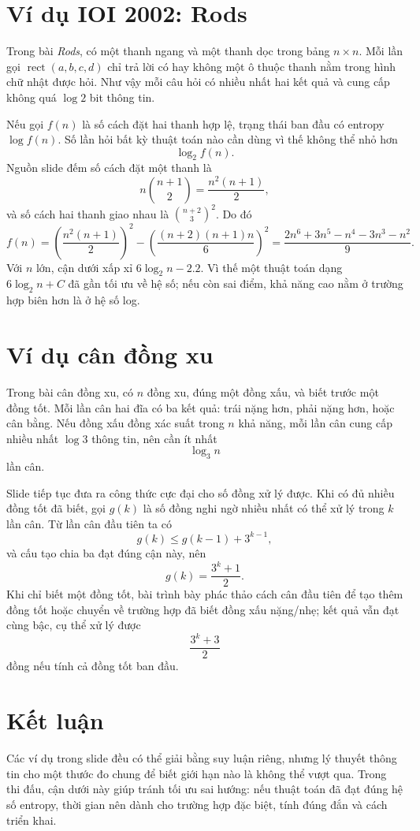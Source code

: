 \documentclass[11pt]{article}
\begin{document}
\section{Ví dụ IOI 2002: Rods}

Trong bài \textit{Rods}, có một thanh ngang và một thanh dọc trong bảng
\(n\times n\). Mỗi lần gọi
\(\operatorname{rect}(a,b,c,d)\) chỉ trả lời có hay không một ô thuộc thanh
nằm trong hình chữ nhật được hỏi. Như vậy mỗi câu hỏi có nhiều nhất hai kết
quả và cung cấp không quá \(\log 2\) bit thông tin.

Nếu gọi \(f(n)\) là số cách đặt hai thanh hợp lệ, trạng thái ban đầu có
entropy \(\log f(n)\). Số lần hỏi bất kỳ thuật toán nào cần dùng vì thế
không thể nhỏ hơn
\[
  \log_2 f(n).
\]
Nguồn slide đếm số cách đặt một thanh là
\[
  n\binom{n+1}{2}=\frac{n^2(n+1)}2,
\]
và số cách hai thanh giao nhau là \(\binom{n+2}{3}^2\). Do đó
\[
  f(n)=
  \left(\frac{n^2(n+1)}2\right)^2
  -
  \left(\frac{(n+2)(n+1)n}{6}\right)^2
  =
  \frac{2n^6+3n^5-n^4-3n^3-n^2}{9}.
\]
Với \(n\) lớn, cận dưới xấp xỉ \(6\log_2 n-2.2\). Vì thế một thuật toán
dạng \(6\log_2 n+C\) đã gần tối ưu về hệ số; nếu còn sai điểm, khả năng cao
nằm ở trường hợp biên hơn là ở hệ số log.

\section{Ví dụ cân đồng xu}

Trong bài cân đồng xu, có \(n\) đồng xu, đúng một đồng xấu, và biết trước một
đồng tốt. Mỗi lần cân hai đĩa có ba kết quả: trái nặng hơn, phải nặng hơn,
hoặc cân bằng. Nếu đồng xấu đồng xác suất trong \(n\) khả năng, mỗi lần cân
cung cấp nhiều nhất \(\log 3\) thông tin, nên cần ít nhất
\[
  \log_3 n
\]
lần cân.

Slide tiếp tục đưa ra công thức cực đại cho số đồng xử lý được. Khi có đủ
nhiều đồng tốt đã biết, gọi \(g(k)\) là số đồng nghi ngờ nhiều nhất có thể
xử lý trong \(k\) lần cân. Từ lần cân đầu tiên ta có
\[
  g(k)\le g(k-1)+3^{k-1},
\]
và cấu tạo chia ba đạt đúng cận này, nên
\[
  g(k)=\frac{3^k+1}{2}.
\]
Khi chỉ biết một đồng tốt, bài trình bày phác thảo cách cân đầu tiên để tạo
thêm đồng tốt hoặc chuyển về trường hợp đã biết đồng xấu nặng/nhẹ; kết quả
vẫn đạt cùng bậc, cụ thể xử lý được
\[
  \frac{3^k+3}{2}
\]
đồng nếu tính cả đồng tốt ban đầu.

\section{Kết luận}

Các ví dụ trong slide đều có thể giải bằng suy luận riêng, nhưng lý thuyết
thông tin cho một thước đo chung để biết giới hạn nào là không thể vượt qua.
Trong thi đấu, cận dưới này giúp tránh tối ưu sai hướng: nếu thuật toán đã
đạt đúng hệ số entropy, thời gian nên dành cho trường hợp đặc biệt, tính đúng
đắn và cách triển khai.
\end{document}
